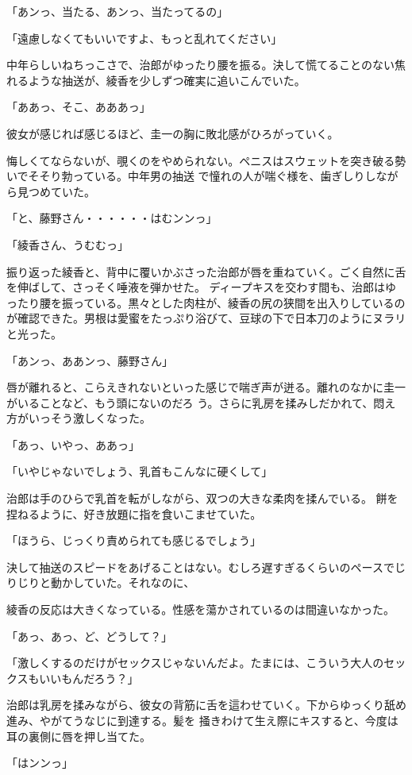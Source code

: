 ﻿\documentclass[book,tate]{jlreq}
\begin{document}
「あンっ、当たる、あンっ、当たってるの」

「遠慮しなくてもいいですよ、もっと乱れてください」

中年らしいねちっこさで、治郎がゆったり腰を振る。決して慌てることのない焦れるような抽送が、綾香を少しずつ確実に追いこんでいた。

「ああっ、そこ、あああっ」

彼女が感じれば感じるほど、圭一の胸に敗北感がひろがっていく。

悔しくてならないが、覗くのをやめられない。ペニスはスウェットを突き破る勢いでそそり勃っている。中年男の抽送 で憧れの人が喘ぐ様を、歯ぎしりしながら見つめていた。

「と、藤野さん・・・・・・はむンンっ」

「綾香さん、うむむっ」

振り返った綾香と、背中に覆いかぶさった治郎が唇を重ねていく。ごく自然に舌を伸ばして、さっそく唾液を弾かせた。 ディープキスを交わす間も、治郎はゆったり腰を振っている。黒々とした肉柱が、綾香の尻の狭間を出入りしているのが確認できた。男根は愛蜜をたっぷり浴びて、豆球の下で日本刀のようにヌラリと光った。

「あンっ、ああンっ、藤野さん」

唇が離れると、こらえきれないといった感じで喘ぎ声が迸る。離れのなかに圭一がいることなど、もう頭にないのだろ う。さらに乳房を揉みしだかれて、悶え方がいっそう激しくなった。

「あっ、いやっ、ああっ」

「いやじゃないでしょう、乳首もこんなに硬くして」

治郎は手のひらで乳首を転がしながら、双つの大きな柔肉を揉んでいる。 餅を捏ねるように、好き放題に指を食いこませていた。

「ほうら、じっくり責められても感じるでしょう」

決して抽送のスピードをあげることはない。むしろ遅すぎるくらいのペースでじりじりと動かしていた。それなのに、

綾香の反応は大きくなっている。性感を蕩かされているのは間違いなかった。

「あっ、あっ、ど、どうして？」

「激しくするのだけがセックスじゃないんだよ。たまには、こういう大人のセックスもいいもんだろう？」

治郎は乳房を揉みながら、彼女の背筋に舌を這わせていく。下からゆっくり舐め進み、やがてうなじに到達する。髪を 掻きわけて生え際にキスすると、今度は耳の裏側に唇を押し当てた。

「はンンっ」
\end{document}

